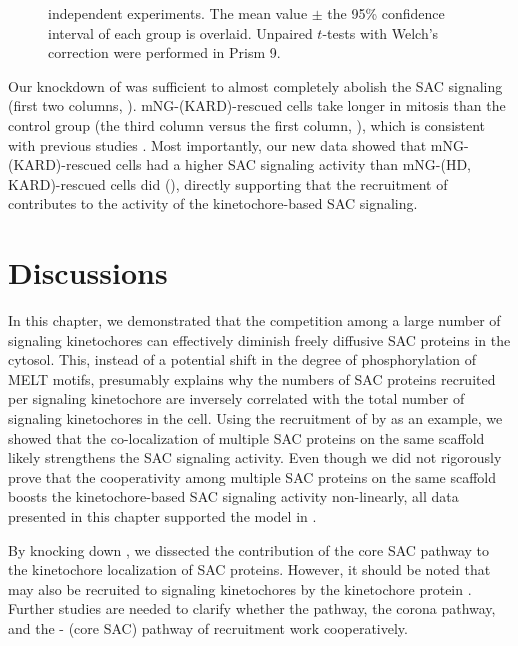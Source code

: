 \begin{figure}
independent experiments. The mean value $\pm$ the 95\% confidence interval of each group is overlaid. Unpaired $t$-tests with Welch's correction were performed in Prism 9.
\end{figure}

Our knockdown of  was sufficient to almost completely abolish the SAC signaling (first two columns, ). mNG-(\textDelta{}KARD)-rescued cells take longer in mitosis than the control group (the third column versus the first column, ), which is consistent with previous studies \cite{PP2A-B56, BUBR1-L669A+I672A}. Most importantly, our new data showed that mNG-(\textDelta{}KARD)-rescued cells had a higher SAC signaling activity than mNG-(\textDelta{}HD, \textDelta{}KARD)-rescued cells did (), directly supporting that the recruitment of   contributes to the activity of the kinetochore-based SAC signaling.

\section{Discussions}
\label{Chapter3Discussions}

In this chapter, we demonstrated that the competition among a large number of signaling kinetochores can effectively diminish freely diffusive SAC proteins in the cytosol. This, instead of a potential shift in the degree of phosphorylation of MELT motifs, presumably explains why the numbers of SAC proteins recruited per signaling kinetochore are inversely correlated with the total number of signaling kinetochores in the cell. Using the recruitment of  by  as an example, we showed that the co-localization of multiple SAC proteins on the same  scaffold likely strengthens the SAC signaling activity. Even though we did not rigorously prove that the cooperativity among multiple SAC proteins on the same  scaffold boosts the kinetochore-based SAC signaling activity non-linearly, all data presented in this chapter supported the model in .

By knocking down , we dissected the contribution of the core SAC pathway to the kinetochore localization of SAC proteins. However, it should be noted that  may also be recruited to signaling kinetochores by the kinetochore protein  \cite{MIS12-CEP57-MAD1-MAD2}. Further studies are needed to clarify whether the  pathway, the corona pathway, and the - (core SAC) pathway of  recruitment work cooperatively.

